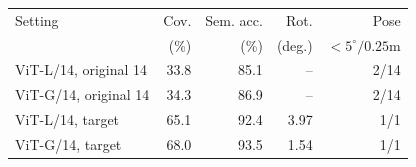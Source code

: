 \begin{tabular}{lrrrr}
\toprule
Setting & Cov. & Sem. acc. & Rot. & Pose \\ 
 & (\%) & (\%) & (deg.) & $<5^\circ/0.25$m \\ 
\midrule
ViT-L/14, original 14 & 33.8 & 85.1 & -- & 2/14 \\
ViT-G/14, original 14 & 34.3 & 86.9 & -- & 2/14 \\
ViT-L/14, target & 65.1 & 92.4 & 3.97 & 1/1 \\
ViT-G/14, target & 68.0 & 93.5 & 1.54 & 1/1 \\
\bottomrule
\end{tabular}
